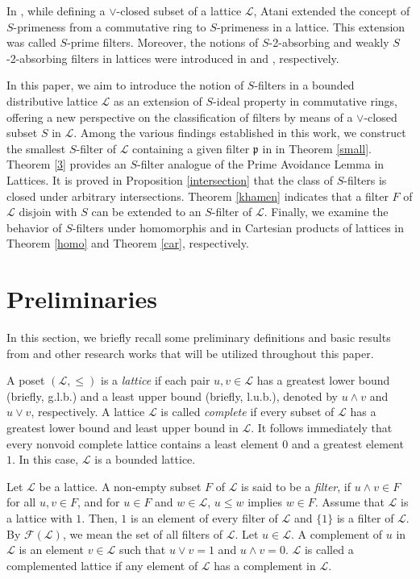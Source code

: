 \documentclass[preprint,review,10pt]{amsart}
\theoremstyle{definition}
\theoremstyle{remark}
\numberwithin{equation}{section}
\begin{document}
In \cite{Atani2}, while defining a $\vee$-closed subset of a lattice $\mathscr{L}$, Atani extended the concept  of $S$-primeness from
a commutative ring to $S$-primeness in a lattice. This extension was called $S$-prime filters. Moreover, the notions of $S$-2-absorbing   and weakly $S$-2-absorbing filters in lattices were introduced in \cite{Atani3} and \cite{Atani5}, respectively.

In this paper, we aim to introduce the notion of $S$-filters in a bounded distributive lattice $\mathscr{L}$ as an extension of $S$-ideal property in commutative rings,  offering a new perspective on the classification of filters by means of a  $\vee$-closed subset $S$ in $\mathscr{L}$. Among the various findings established in this work,   we construct the smallest $S$-filter of $\mathscr{L}$ containing a given filter $\mathfrak{p}$ in in Theorem \ref{small}. Theorem \ref{3} provides an $S$-filter analogue of the Prime Avoidance Lemma in Lattices. It is proved in Proposition \ref{intersection} that the class of   $S$-filters is closed under arbitrary intersections. Theorem \ref{khamen} indicates that a filter $F$ of $\mathscr{L}$ disjoin with $S$ can be extended to an $S$-filter of $\mathscr{L}$. Finally, we examine the  behavior of $S$-filters under homomorphis and in Cartesian products of lattices in Theorem \ref{homo} and Theorem \ref{car}, respectively.  


\section{Preliminaries}
In this section, we briefly recall some preliminary definitions and basic results  from \cite{Birkhoff} and other research works that will be utilized throughout this paper.

A poset $(\mathscr{L}, \le)$ is a  \textit{lattice}  if   each pair $u, v \in \mathscr{L}$ has a  greatest lower bound (briefly, g.l.b.) and a   least upper bound (briefly, l.u.b.), denoted by $u \wedge v$ and $u \vee v$, respectively. 
A lattice $\mathscr{L}$ is called  \textit{complete}  if every subset of $\mathscr{L}$ has a greatest lower bound and least upper bound in $\mathscr{L}$. It follows immediately that every nonvoid complete lattice contains a least element $0$ and a greatest element $1$. In this case, $\mathscr{L}$ is a bounded lattice.





Let $\mathscr{L}$ be a lattice. A non-empty subset  $F$ of $\mathscr{L}$ is said to be a \textit{filter}, if $u \wedge v \in F$ for all $u, v \in F$, and for $u \in F$ and $w \in \mathscr{L}$, $u \le w$ implies $w \in F$. Assume that $\mathscr{L}$ is a lattice with $1$. Then,  $1$ is an element of   every filter of $\mathscr{L}$ and $\{1\}$ is a filter of $\mathscr{L}$. By $\mathcal{F}(\mathscr{L})$, we mean the set of all filters of $\mathscr{L}$. Let $u \in \mathscr{L}$.  A complement of $u$ in $\mathscr{L}$ is an element $v \in \mathscr{L}$ such that $u \vee v = 1$ and $u \wedge v= 0$.   $\mathscr{L}$ is called a complemented lattice if any element of $\mathscr{L}$ has a complement in $\mathscr{L}$.
\end{document}
